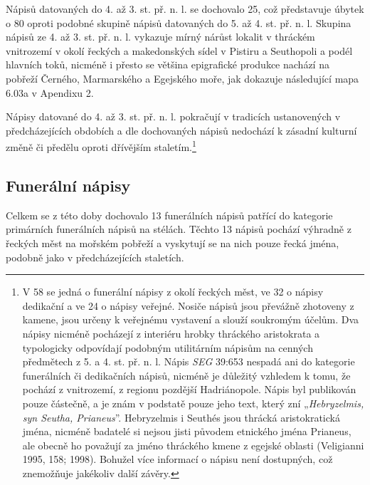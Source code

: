 \NC\AR
\HL
\HL
\stoptable

Nápisů datovaných do 4. až 3. st. př. n. l. se dochovalo 25, což představuje úbytek o 80  oproti podobné skupině nápisů datovaných do 5. až 4. st. př. n. l. Skupina nápisů ze 4. až 3. st. př. n. l. vykazuje mírný nárůst lokalit v thráckém vnitrozemí v okolí řeckých a makedonských sídel v Pistiru a Seuthopoli a podél hlavních toků, nicméně i přesto se většina epigrafické produkce nachází na pobřeží Černého, Marmarského a Egejského moře, jak dokazuje následující mapa 6.03a v Apendixu 2.

Nápisy datované do 4. až 3. st. př. n. l. pokračují v tradicích ustanovených v předcházejících obdobích a dle dochovaných nápisů nedochází k zásadní kulturní změně či předělu oproti dřívějším staletím.\footnote{V 58  se jedná o funerální nápisy z okolí řeckých měst, ve 32  o nápisy dedikační a ve 24  o nápisy veřejné. Nosiče nápisů jsou převážně zhotoveny z kamene, jsou určeny k veřejnému vystavení a slouží soukromým účelům. Dva nápisy nicméně pocházejí z interiéru hrobky thráckého aristokrata a typologicky odpovídají podobným utilitárním nápisům na cenných předmětech z 5. a 4. st. př. n. l. Nápis {\em SEG} 39:653 nespadá ani do kategorie funerálních či dedikačních nápisů, nicméně je důležitý vzhledem k tomu, že pochází z vnitrozemí, z regionu pozdější Hadriánopole. Nápis byl publikován pouze částečně, a je znám v podstatě pouze jeho text, který zní „{\em Hebryzelmis, syn Seutha, Prianeus}”. Hebryzelmis i Seuthés jsou thrácká aristokratická jména, nicméně badatelé si nejsou jisti původem etnického jména Prianeus, ale obecně ho považují za jméno thráckého kmene z egejské oblasti (Veligianni 1995, 158; 1998). Bohužel více informací o nápisu není dostupných, což znemožňuje jakékoliv další závěry.}

\subsection[funerální-nápisy-4]{Funerální nápisy}

Celkem se z této doby dochovalo 13 funerálních nápisů patřící do kategorie primárních funerálních nápisů na stélách. Těchto 13 nápisů pochází výhradně z řeckých měst na mořském pobřeží a vyskytují se na nich pouze řecká jména, podobně jako v předcházejících staletích.

